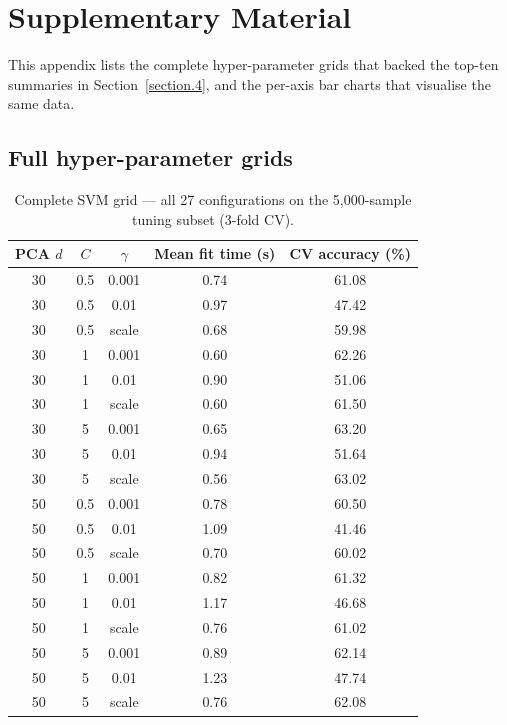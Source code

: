 \documentclass[../main.tex]{subfiles}
\begin{document}
\appendix
\section{Supplementary Material}\label{appendix.tuning}

\noindent
This appendix lists the complete hyper-parameter grids that backed the
top-ten summaries in Section~\ref{section.4}, and the per-axis bar charts
that visualise the same data.

\subsection{Full hyper-parameter grids}

\begin{table}[!htbp]
    \centering
    \caption{Complete SVM grid — all 27 configurations on the
    5{,}000-sample tuning subset (3-fold CV).}
    \label{tab.svm-full}
    \begin{tabular}{ccccc}
        \toprule
        \textbf{PCA $d$} & \textbf{$C$} & \textbf{$\gamma$} &
        \textbf{Mean fit time (s)} & \textbf{CV accuracy (\%)} \\
        \midrule
        30 & 0.5 & 0.001 & 0.74 & 61.08 \\
        30 & 0.5 & 0.01 & 0.97 & 47.42 \\
        30 & 0.5 & scale & 0.68 & 59.98 \\
        30 & 1 & 0.001 & 0.60 & 62.26 \\
        30 & 1 & 0.01 & 0.90 & 51.06 \\
        30 & 1 & scale & 0.60 & 61.50 \\
        30 & 5 & 0.001 & 0.65 & 63.20 \\
        30 & 5 & 0.01 & 0.94 & 51.64 \\
        30 & 5 & scale & 0.56 & 63.02 \\
        50 & 0.5 & 0.001 & 0.78 & 60.50 \\
        50 & 0.5 & 0.01 & 1.09 & 41.46 \\
        50 & 0.5 & scale & 0.70 & 60.02 \\
        50 & 1 & 0.001 & 0.82 & 61.32 \\
        50 & 1 & 0.01 & 1.17 & 46.68 \\
        50 & 1 & scale & 0.76 & 61.02 \\
        50 & 5 & 0.001 & 0.89 & 62.14 \\
        50 & 5 & 0.01 & 1.23 & 47.74 \\
        50 & 5 & scale & 0.76 & 62.08 \\

\end{tabular}
\end{table}
\end{document}
